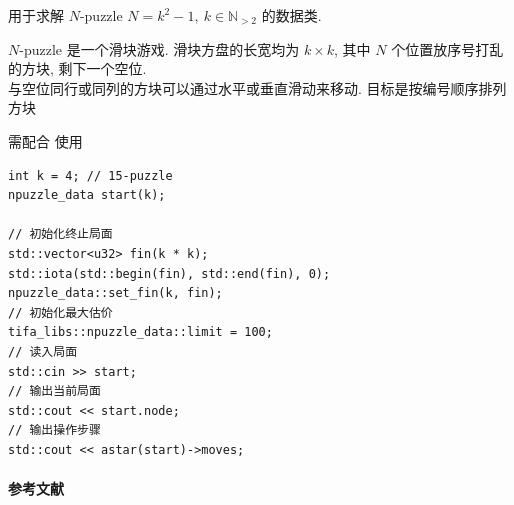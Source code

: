 用于求解 \(N\)-puzzle \(N=k^2-1,~k\in\mathbb{N}_{>2}\) 的数据类.

\(N\)-puzzle 是一个滑块游戏. 滑块方盘的长宽均为 \(k\times k\), 其中 \(N\) 个位置放序号打乱的方块, 剩下一个空位. \\ 与空位同行或同列的方块可以通过水平或垂直滑动来移动. 目标是按编号顺序排列方块

需配合  使用

\begin{verbatim}
int k = 4; // 15-puzzle
npuzzle_data start(k);

// 初始化终止局面
std::vector<u32> fin(k * k);
std::iota(std::begin(fin), std::end(fin), 0);
npuzzle_data::set_fin(k, fin);
// 初始化最大估价
tifa_libs::npuzzle_data::limit = 100;
// 读入局面
std::cin >> start;
// 输出当前局面
std::cout << start.node;
// 输出操作步骤
std::cout << astar(start)->moves;
\end{verbatim}

\paragraph{参考文献} \cite{johnson1879notes} \cite{archer1999modern}

